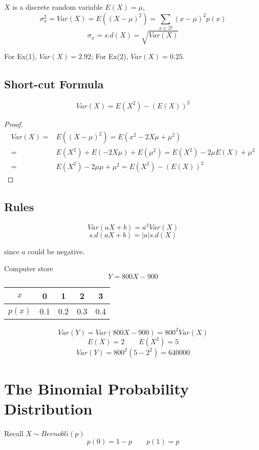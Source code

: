 \begin{defn}
$X$ is a discrete random variable $E(X)=\mu$, 
\[\sigma_{x}^2=Var(X)=E((X-\mu)^2)=\sum_{x \in \mathcal{D}} (x-\mu)^2p(x)\]
\[\sigma_x=s.d(X)=\sqrt{Var(X)}\]
\end{defn}

For Ex(1), $Var(X)=2.92$; For Ex(2), $Var(X)=0.25$.


\subsection{Short-cut Formula}
\begin{prop}
\[Var(X)=E(X^2)-(E(X))^2\]
\begin{proof}
\begin{align*}
Var(X)=& E((X-\mu)^2)= E(x^2-2X\mu+\mu^2)\\
=&E(X^2)+E(-2X\mu)+E(\mu^2) = E(X^2)-2\mu E(X)+\mu^2 \\
=& E(X^2)-2\mu \mu+\mu^2 = E(X^2)-(E(X))^2
\end{align*}
\end{proof}
\end{prop}

\subsection{Rules}
\begin{prop}
\[Var(aX+b)=a^2 Var(X)\]
\[s.d(aX+b)=|a| s.d(X)\]

since $a$ could be negative.
\end{prop}

\begin{exmp}
Computer store
\[Y=800X-900\]

\begin{center}
\begin{tabular}{c|cccc}
\hline
$x$ & 0 & 1 & 2 & 3 \\
\hline
$p(x)$  & 0.1 & 0.2  & 0.3  & 0.4 \\
\hline
\end{tabular}
\end{center}

\[Var(Y)=Var(800X-900)=800^2 Var(X)\]
\[E(X)=2 \qquad E(X^2)=5\]
\[Var(Y)=800^2(5-2^2)=640000\]
\end{exmp}


\section{The Binomial Probability Distribution}
Recall $X \sim Bernobli(p)$
\[p(0)=1-p \qquad p(1)=p\]

